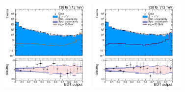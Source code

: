 \begin{figure}[htbp]
\begin{center}
		\includegraphics[width=0.42\textwidth]{figures/chapter04/BDT_score/mvaVal_M15_log.png}
		\includegraphics[width=0.42\textwidth]{figures/chapter04/BDT_score/mvaVal_M20_log.png}\\
    \label{fig:BDT_score2}
\end{center}
\end{figure}

